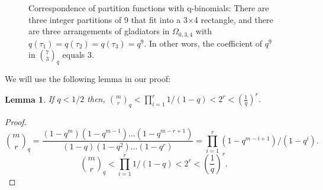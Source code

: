 \documentclass[10 pt]{article}
\newtheorem{lemma}[thm]{Lemma}
\begin{document}
\begin{figure}[!h]
\caption{Correspondence of partition functions with q-binomials: There are three integer partitions of 9 that fit into a 3$\times$4 rectangle,
and there are three arrangements of gladiators in $\Omega_{0,3,4}$ with $q(\tau_1)=q(\tau_2)=q(\tau_3)=q^9$. In other wors, the coefficient
of $q^9$ in ${{7}\choose{3}}_q$ equals 3.}\label{qbin}
\end{figure}
We will use the following lemma in our proof:
\begin{lemma}\label{qlemma}
 If $q<1/2$ then, $
{{m}\choose{r} }_q<\prod_{i=1}^{r} {1} /{(1-q)}< 2^r < (\frac{1}{q})^r$.
\end{lemma}
\begin{proof}
$$
{{m}\choose{r} }_q=\frac{(1-q^m)(1-q^{m-1})\dots (1-q^{m-r+1})}{(1-q)(1-q^2)\dots (1-q^r)}=\prod_{i=1}^{r} {(1-q^{m-i+1})} /{(1-q^i)}.
$$
$$
{{m}\choose{r} }_q<\prod_{i=1}^{r} {1} /{(1-q)}< 2^r < (\frac{1}{q})^r.
$$
\end{proof}
\end{document}
